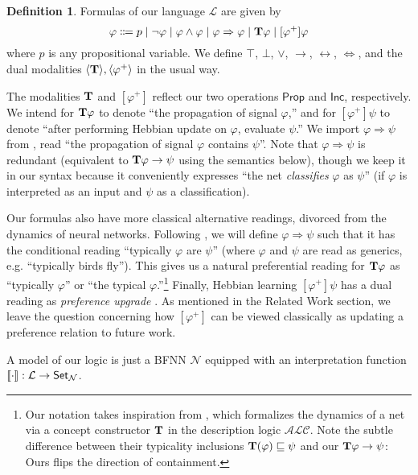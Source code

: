 \documentclass[letterpaper]{article}
\theoremstyle{definition}
\newtheorem{definition}{Definition}
\newcommand{\Set}{\mbox{\sf Set}}
\newcommand{\semantics}[1]{[\![\mbox{\em $ #1 $\/}]\!]}
\newcommand{\lang}{\mathcal{L}}
\newcommand{\Typ}{\textrm{\textup{\textbf{T}}}}
\newcommand{\Prop}{\textsf{Prop}}
\newcommand{\Inc}{\textsf{Inc}}
\newcommand{\Net}{\mathcal{N}}
\begin{document}
\begin{definition}  Formulas of our language $\lang$ are given by
\[
\varphi \Coloneqq p \mid \neg \varphi \mid \varphi \land \varphi \mid \varphi \Rightarrow \varphi \mid \Typ \varphi \mid [\varphi^+] \varphi
\]
where $p$ is any propositional variable.  We define $\top$, $\bot$, $\lor$, $\to$, $\leftrightarrow$, $\Leftrightarrow$, and the dual modalities $\langle \Typ \rangle, \langle \varphi^+ \rangle$ in the usual way.
\end{definition}

The modalities $\Typ$ and $[\varphi^+]$ reflect our two operations $\Prop$ and $\Inc$, respectively.  We intend for $\Typ \varphi$ to denote ``the propagation of signal $\varphi$,'' and for $[\varphi^+] \psi$ to denote ``after performing Hebbian update on $\varphi$, evaluate $\psi$.''  We import ${\varphi \Rightarrow \psi}$ from \citep{leitgeb2001nonmonotonic}, read ``the propagation of signal $\varphi$ contains $\psi$''.  Note that ${\varphi \Rightarrow \psi}$ is redundant (equivalent to $\Typ \varphi \to \psi$ using the semantics below), though we keep it in our syntax because it conveniently expresses ``the net \emph{classifies} $\varphi$ as $\psi$'' (if $\varphi$ is interpreted as an input and $\psi$ as a classification).

Our formulas also have more classical alternative readings, divorced from the dynamics of neural networks.  Following \citep{leitgeb2001nonmonotonic}, we will define $\varphi \Rightarrow \psi$ such that it has the conditional reading ``typically $\varphi$ are $\psi$'' (where $\varphi$ and $\psi$ are read as generics, e.g. ``typically birds fly'').  This gives us a natural preferential reading for $\Typ \varphi$ as ``typically $\varphi$'' or ``the typical $\varphi$.''\footnote{Our notation takes inspiration from \citep{giordano2021}, which formalizes the dynamics of a net via a concept constructor $\Typ$ in the description logic $\mathcal{ALC}$.  Note the subtle difference between their typicality inclusions $\Typ(\varphi) \sqsubseteq \psi$ and our $\Typ \varphi \to \psi$: Ours flips the direction of containment.} 
Finally, Hebbian learning $[\varphi^+] \psi$ has a dual reading as \emph{preference upgrade}  \citep{van2007prefupgrade}.  As mentioned in the Related Work section, we leave the question concerning how $[\varphi^+]$ can be viewed classically as updating a preference relation to future work.

A model of our logic is just a BFNN $\Net$ equipped with an interpretation function $\semantics{\cdot} : \lang \to \Set_\Net$.
\end{document}
